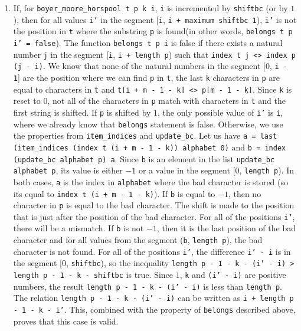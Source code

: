 \begin{enumerate}
\item If, for \texttt{boyer\_moore\_horspool t p k i}, \texttt{i} is incremented by \texttt{shiftbc} (or by \(1\)), then for all values \texttt{i'} in the segment [\texttt{i}, \texttt{i + maximum shiftbc 1}), \texttt{i'} is not the position in \texttt{t} where the substring \texttt{p} is found(in other words, \texttt{belongs t p i' = false}). The function \texttt{belongs t p i} is false if there exists a natural number \texttt{j} in the segment [\texttt{i}, \texttt{i + length p}) such that \texttt{index t j <> index p (j - i)}. We know that none of the natural numbers in the segment [\(0\), \texttt{i - 1}] are the position where we can find \texttt{p} in \texttt{t}, the last \texttt{k} characters in \texttt{p} are equal to characters in \texttt{t} and \texttt{t[i + m - 1 - k] <> p[m - 1 - k]}. Since \texttt{k} is reset to \(0\), not all of the characters in \texttt{p} match with characters in \texttt{t} and the first string is shifted. If \texttt{p} is shifted by \(1\), the only possible value of \texttt{i'} is \texttt{i}, where we already know that \texttt{belongs} statement is false. Otherwise, we use the properties from \texttt{item\_indices} and \texttt{update\_bc}. Let us have \texttt{a = last (item\_indices (index t (i + m - 1 - k)) alphabet 0)} and \texttt{b = index (update\_bc alphabet p) a}. Since \texttt{b} is an element in the list \texttt{update\_bc alphabet p}, its value is either \(-1\) or a value in the segment [\(0\), \texttt{length p}). In both cases, \texttt{a} is the index in \texttt{alphabet} where the bad character is stored (so its equal to \texttt{index t (i + m - 1 - k)}). If \texttt{b} is equal to \(-1\), then no character in \texttt{p} is equal to the bad character. The shift is made to the position that is just after the position of the bad character. For all of the positions \texttt{i'}, there will be a mismatch. If \texttt{b} is not \(-1\), then it is the last position of the bad character and for all values from the segment (\texttt{b}, \texttt{length p}), the bad character is not found. For all of the positions \texttt{i'}, the difference \texttt{i' - i} is in the segment [\(0\), \texttt{shiftbc}), so the inequality \texttt{length p - 1 - k - (i' - i) > length p - 1 - k - shiftbc} is true. Since \(1\), \texttt{k} and \texttt{(i' - i)} are positive numbers, the result \texttt{length p - 1 - k - (i' - i)} is less than \texttt{length p}. The relation \texttt{length p - 1 - k - (i' - i)} can be written as \texttt{i + length p - 1 - k - i'}. This, combined with the property of \texttt{belongs} described above, proves that this case is valid. 
\end{enumerate}


